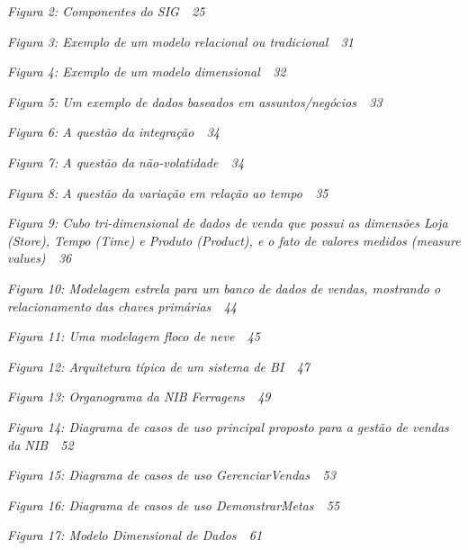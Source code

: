 \documentclass[a4paper]{article}
\begin{document}
{\sffamily\itshape
\textup{Figura 2: Componentes do SIG\ \ 25}}

{\sffamily\itshape
\textup{Figura 3: Exemplo de um modelo relacional ou tradicional\ \ 31}}

{\sffamily\itshape
\textup{Figura 4: Exemplo de um modelo dimensional\ \ 32}}

{\sffamily\itshape
\textup{Figura 5: Um exemplo de dados baseados em assuntos/neg\'ocios\ \ 33}}

{\sffamily\itshape
\textup{Figura 6: A quest\~ao da integra\c{c}\~ao\ \ 34}}

{\sffamily\itshape
\textup{Figura 7: A quest\~ao da n\~ao-volatidade\ \ 34}}

{\sffamily\itshape
\textup{Figura 8: A quest\~ao da varia\c{c}\~ao em rela\c{c}\~ao ao tempo\ \ 35}}

{\sffamily\itshape
\textup{Figura 9: Cubo tri-dimensional de dados de venda que possui as dimens\~oes Loja (Store), Tempo (Time) e Produto
(Product), e o fato de valores medidos (measure values)\ \ 36}}

{\sffamily\itshape
\textup{Figura 10: Modelagem estrela para um banco de dados de vendas, mostrando o relacionamento das chaves
prim\'arias\ \ 44}}

{\sffamily\itshape
\textup{Figura 11: Uma modelagem floco de neve\ \ 45}}

{\sffamily\itshape
\textup{Figura 12: Arquitetura t\'ipica de um sistema de BI\ \ 47}}

{\sffamily\itshape
\textup{Figura 13: Organograma da NIB Ferragens\ \ 49}}

{\sffamily\itshape
\textup{Figura 14: Diagrama de casos de uso principal proposto para a gest\~ao de vendas da NIB\ \ 52}}

{\sffamily\itshape
\textup{Figura 15: Diagrama de casos de uso GerenciarVendas\ \ 53}}

{\sffamily\itshape
\textup{Figura 16: Diagrama de casos de uso DemonstrarMetas\ \ 55}}

{\sffamily\itshape
\textup{Figura 17: Modelo Dimensional de Dados\ \ 61}}
\end{document}
